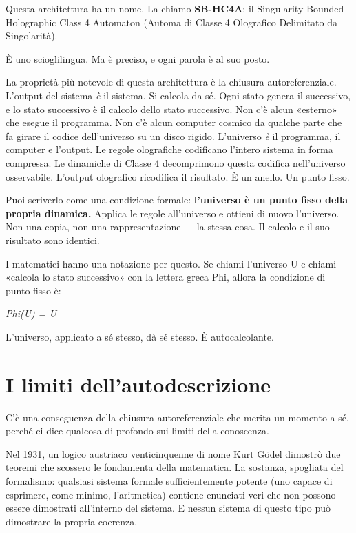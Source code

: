 \documentclass[11pt, twoside, openright]{book}
\begin{document}
Questa architettura ha un nome. La chiamo \textbf{SB-HC4A}: il Singularity-Bounded Holographic Class 4 Automaton (Automa di Classe 4 Olografico Delimitato da Singolarità).

È uno scioglilingua. Ma è preciso, e ogni parola è al suo posto.

La proprietà più notevole di questa architettura è la chiusura autoreferenziale. L'output del sistema \textit{è} il sistema. Si calcola da sé. Ogni stato genera il successivo, e lo stato successivo è il calcolo dello stato successivo. Non c'è alcun «esterno» che esegue il programma. Non c'è alcun computer cosmico da qualche parte che fa girare il codice dell'universo su un disco rigido. L'universo \textit{è} il programma, il computer e l'output. Le regole olografiche codificano l'intero sistema in forma compressa. Le dinamiche di Classe 4 decomprimono questa codifica nell'universo osservabile. L'output olografico ricodifica il risultato. È un anello. Un punto fisso.

Puoi scriverlo come una condizione formale: \textbf{l'universo è un punto fisso della propria dinamica.} Applica le regole all'universo e ottieni di nuovo l'universo. Non una copia, non una rappresentazione --- la stessa cosa. Il calcolo e il suo risultato sono identici.

I matematici hanno una notazione per questo. Se chiami l'universo U e chiami «calcola lo stato successivo» con la lettera greca Phi, allora la condizione di punto fisso è:

\textit{Phi(U) = U}

L'universo, applicato a sé stesso, dà sé stesso. È autocalcolante.


\section*{I limiti dell'autodescrizione}

C'è una conseguenza della chiusura autoreferenziale che merita un momento a sé, perché ci dice qualcosa di profondo sui limiti della conoscenza.

Nel 1931, un logico austriaco venticinquenne di nome Kurt Gödel dimostrò due teoremi che scossero le fondamenta della matematica. La sostanza, spogliata del formalismo: qualsiasi sistema formale sufficientemente potente (uno capace di esprimere, come minimo, l'aritmetica) contiene enunciati veri che non possono essere dimostrati all'interno del sistema. E nessun sistema di questo tipo può dimostrare la propria coerenza.
\end{document}
